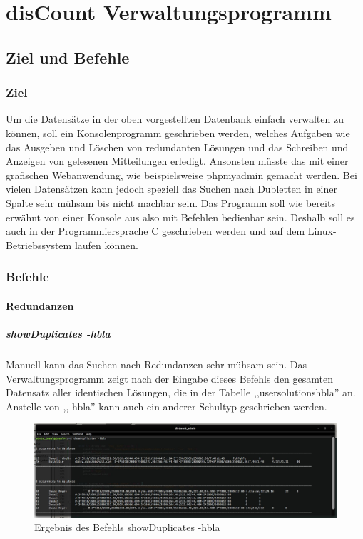 \documentclass[12pt]{report}
\begin{document}
  

\part{disCount Verwaltungsprogramm}

\chapter{Ziel und Befehle}

\section{Ziel}
Um die Datensätze in der oben vorgestellten Datenbank einfach verwalten zu können, soll ein Konsolenprogramm geschrieben werden, welches Aufgaben wie das Ausgeben und Löschen von redundanten Lösungen und das Schreiben und Anzeigen von gelesenen Mitteilungen erledigt. Ansonsten müsste das mit einer grafischen Webanwendung, wie beispielsweise phpmyadmin gemacht werden. Bei vielen Datensätzen kann jedoch speziell das Suchen nach Dubletten in einer Spalte sehr mühsam bis nicht machbar sein. Das Programm soll wie bereits erwähnt von einer Konsole aus also mit Befehlen bedienbar sein. Deshalb soll es auch in der Programmiersprache C geschrieben werden und auf dem Linux-Betriebssystem laufen können.

\section{Befehle}

\subsection{Redundanzen}

\subsubsection{showDuplicates -hbla}
Manuell kann das Suchen nach Redundanzen sehr mühsam sein. Das Verwaltungsprogramm zeigt nach der Eingabe dieses Befehls den gesamten Datensatz aller identischen Lösungen, die in der Tabelle ,,usersolutionshbla'' an. Anstelle von ,,-hbla'' kann auch ein anderer Schultyp geschrieben werden.

\begin{figure}[h]
	\centering
	\includegraphics[width=15cm]{images/showDuplicates_hbla}
	\caption[Befehl showDuplicates -hbla]{Ergebnis des Befehls showDuplicates -hbla}
\end{figure}
\end{document}

